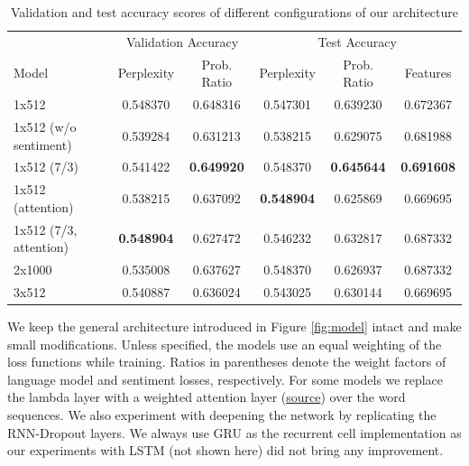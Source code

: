 \documentclass{article}
\begin{document}
\begin{table}[htbp]
\centering
\begin{tabularx}{\textwidth}{X|cc|ccc}
\toprule
                        & \multicolumn{2}{c|}{Validation Accuracy}  & \multicolumn{3}{c}{Test Accuracy}                           \\
Model                   & Perplexity          & Prob. Ratio         & Perplexity         & Prob. Ratio        & Features          \\ \hline
1x512                   & 0.548370            & 0.648316            & 0.547301           & 0.639230           & 0.672367          \\
1x512 (w/o sentiment)   & 0.539284            & 0.631213            & 0.538215           & 0.629075           & 0.681988          \\
1x512 (7/3)             & 0.541422            & \textbf{0.649920}   & 0.548370           & \textbf{0.645644}  & \textbf{0.691608} \\
1x512 (attention)       & 0.538215            & 0.637092            & \textbf{0.548904}  & 0.625869           & 0.669695          \\
1x512 (7/3, attention)  & \textbf{0.548904}   & 0.627472            & 0.546232           & 0.632817           & 0.687332          \\
2x1000                  & 0.535008            & 0.637627            & 0.548370           & 0.626937           & 0.687332          \\
3x512                   & 0.540887            & 0.636024            & 0.543025           & 0.630144           & 0.669695          \\
\bottomrule
\end{tabularx}
\label{tab:results}
\caption{Validation and test accuracy scores of different configurations of our architecture}
\end{table}

\par We keep the general architecture introduced in Figure \ref{fig:model} intact and make small modifications. Unless specified, the models use an equal weighting of the loss functions while training. Ratios in parentheses denote the weight factors of language model and sentiment losses, respectively. For some models we replace the lambda layer with a weighted attention layer (\href{https://pypi.org/project/keras-self-attention/}{source}) over the word sequences. We also experiment with deepening the network by replicating the RNN-Dropout layers. We always use GRU as the recurrent cell implementation as our experiments with LSTM (not shown here) did not bring any improvement.
\end{document}
